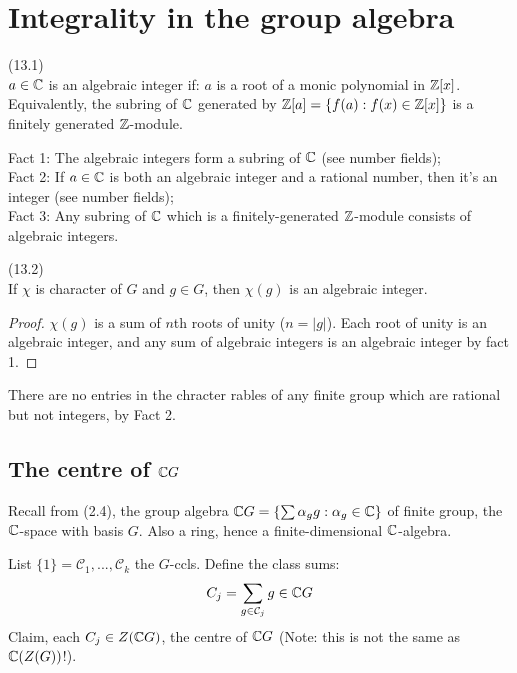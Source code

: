 \documentclass[a4paper]{article}
\begin{document}
\newpage
\section{Integrality in the group algebra}

\begin{defi} (13.1)\\
$a \in \mathbb{C}$ is an algebraic integer if: $a$ is a root of a monic polynomial in $\mathbb{Z}[x]$. Equivalently, the subring of $\mathbb{C}$ generated by $\mathbb{Z}[a] = \{f(a): f(x) \in \mathbb{Z}[x]\}$ is a finitely generated $\mathbb{Z}$-module.
\end{defi}

Fact 1: The algebraic integers form a subring of $\mathbb{C}$ (see number fields);\\
Fact 2: If $a \in \mathbb{C}$ is both an algebraic integer and a rational number, then it's an integer (see number fields);\\
Fact 3: Any subring of $\mathbb{C}$ which is a finitely-generated $\mathbb{Z}$-module consists of algebraic integers.

\begin{prop} (13.2)\\
If $\chi$ is character of $G$ and $g \in G$, then $\chi(g)$ is an algebraic integer.
\begin{proof}
$\chi(g)$ is a sum of $n$th roots of unity ($n=|g|$). Each root of unity is an algebraic integer, and any sum of algebraic integers is an algebraic integer by fact 1.
\end{proof}
\end{prop}

\begin{coro}
There are no entries in the chracter rables of any finite group which are rational but not integers, by Fact 2.
\end{coro}

\subsection{The centre of $\mathbb{C} G$}
Recall from (2.4), the group algebra $\mathbb{C} G =\{ \sum \alpha_g g: \alpha_g \in \mathbb{C}\}$ of finite group, the $\mathbb{C}$-space with basis $G$. Also a ring, hence a finite-dimensional $\mathbb{C}$-algebra.

List $\{1\} = \mathcal{C}_1,...,\mathcal{C}_k$ the $G$-ccls. Define the class sums:
\begin{equation*}
\begin{aligned}
C_j = \sum_{g \in \mathcal{C}_j} g \in \mathbb{C} G
\end{aligned}
\end{equation*}
Claim, each $C_j \in Z(\mathbb{C} G)$, the centre of $\mathbb{C} G$ (Note: this is not the same as $\mathbb{C}(Z(G))$!).
\end{document}
